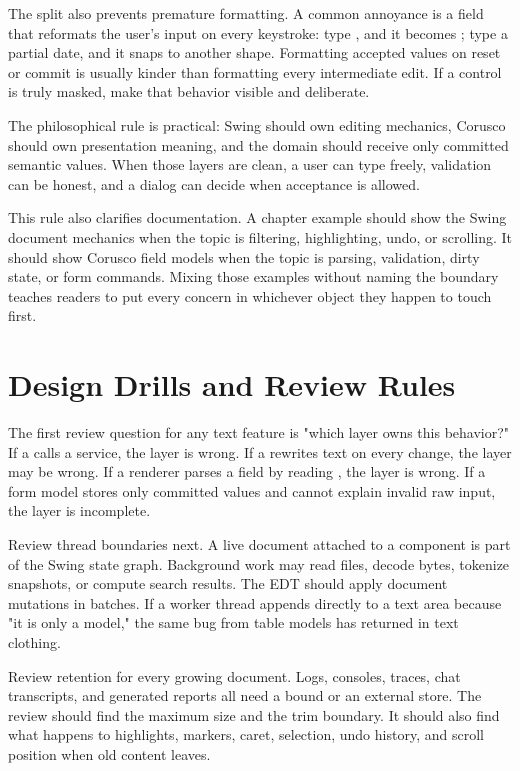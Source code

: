 The split also prevents premature formatting. A common annoyance is a field that reformats the user's input on every keystroke: type , and it becomes ; type a partial date, and it snaps to another shape. Formatting accepted values on reset or commit is usually kinder than formatting every intermediate edit. If a control is truly masked, make that behavior visible and deliberate.

The philosophical rule is practical: Swing should own editing mechanics, Corusco should own presentation meaning, and the domain should receive only committed semantic values. When those layers are clean, a user can type freely, validation can be honest, and a dialog can decide when acceptance is allowed.

This rule also clarifies documentation. A chapter example should show the Swing document mechanics when the topic is filtering, highlighting, undo, or scrolling. It should show Corusco field models when the topic is parsing, validation, dirty state, or form commands. Mixing those examples without naming the boundary teaches readers to put every concern in whichever object they happen to touch first.

\section{Design Drills and Review Rules}

The first review question for any text feature is "which layer owns this behavior?" If a  calls a service, the layer is wrong. If a  rewrites text on every change, the layer may be wrong. If a renderer parses a field by reading , the layer is wrong. If a form model stores only committed values and cannot explain invalid raw input, the layer is incomplete.

Review thread boundaries next. A live document attached to a component is part of the Swing state graph. Background work may read files, decode bytes, tokenize snapshots, or compute search results. The EDT should apply document mutations in batches. If a worker thread appends directly to a text area because "it is only a model," the same bug from table models has returned in text clothing.

Review retention for every growing document. Logs, consoles, traces, chat transcripts, and generated reports all need a bound or an external store. The review should find the maximum size and the trim boundary. It should also find what happens to highlights, markers, caret, selection, undo history, and scroll position when old content leaves.

